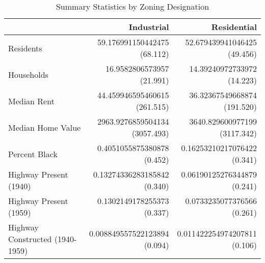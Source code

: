 \begin{table}[h]
\centering
\caption{Summary Statistics by Zoning Designation}
\label{tab:summary_stats_zone}
\begin{tabular*}{\linewidth}{@{\extracolsep{\fill}}l*{2}{r}}
\toprule
 & Industrial & Residential \\
\midrule
Residents & \makecell[tr]{59.176991150442475 \\ (68.112)} & \makecell[tr]{52.679439941046425 \\ (49.456)} \\
Households & \makecell[tr]{16.9582806573957 \\ (21.991)} & \makecell[tr]{14.39240972733972 \\ (14.223)} \\
Median Rent & \makecell[tr]{44.459946595460615 \\ (261.515)} & \makecell[tr]{36.32367549668874 \\ (191.520)} \\
Median Home Value & \makecell[tr]{2963.9276859504134 \\ (3057.493)} & \makecell[tr]{3640.829600977199 \\ (3117.342)} \\
Percent Black & \makecell[tr]{0.4051055875380878 \\ (0.452)} & \makecell[tr]{0.16253210217076422 \\ (0.341)} \\
Highway Present (1940) & \makecell[tr]{0.13274336283185842 \\ (0.340)} & \makecell[tr]{0.06190125276344879 \\ (0.241)} \\
Highway Present (1959) & \makecell[tr]{0.1302149178255373 \\ (0.337)} & \makecell[tr]{0.0733235077376566 \\ (0.261)} \\
Highway Constructed (1940-1959) & \makecell[tr]{0.008849557522123894 \\ (0.094)} & \makecell[tr]{0.011422254974207811 \\ (0.106)} \\
\bottomrule
\end{tabular*}
\end{table}
